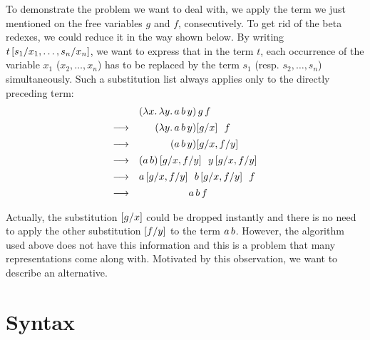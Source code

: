 \documentclass[submission,copyright,creativecommons]{eptcs}
\begin{document}
To demonstrate the problem we want to deal with, we apply the term we just mentioned on the free variables $g$ and $f$, consecutively.
To get rid of the beta redexes, we could reduce it in the way shown below. By writing $t\left[ s_1 / x_1 , \ldots, s_n / x_n \right]$, we want to express that in the term $t$, each occurrence of the variable $x_1$ ($x_2, \ldots, x_n$) has to be replaced by the term $s_1$ (resp. $s_2, \ldots, s_n$) simultaneously. Such a substitution list always applies only to the directly preceding term:
\[
\begin{array}{lr@{}l}
\shspace &(\LaA x {\LaA y {\ApA{\ApA a b} y}}) & \sspace g \sspace f \\ 
\shspace\re &(\LaA y {\ApA{\ApA a b} y}) & \sub g x \lspace f \\ 
\shspace\re &      (\ApA{\ApA a b} y) & \subs g x f y \\ 
\shspace\re &      \multicolumn 2 l {(a\sspace b)\subs g x f y \lspace y\subs g x f y} \\ 
\shspace\re &      \multicolumn 2 l {a\subs g x f y \lspace b\subs g x f y \lspace f} \\ 
\shspace\re &      \multicolumn 2 {c} {a \sspace b \sspace f}  \\ 
\end{array}
\]
Actually, the substitution $\left[ g / x \right]$ could be dropped instantly and there is no need to apply the other substitution $\left[ f / y \right]$ to the term $a \, b$. However, the algorithm used above does not have this information and this is a problem that many representations come along with. Motivated by this observation, we want to describe an alternative.

\section{Syntax}
\end{document}
